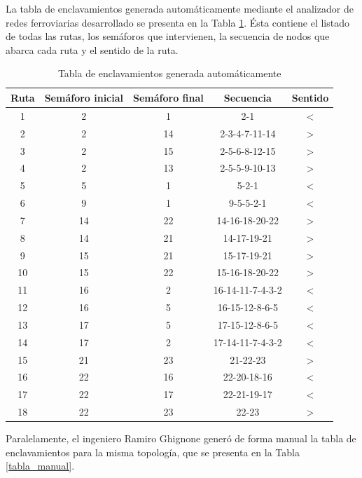 	La tabla de enclavamientos generada automáticamente mediante el analizador de redes ferroviarias desarrollado se presenta en la Tabla \ref{tabla_script}. Ésta contiene el listado de todas las rutas, los semáforos que intervienen, la secuencia de nodos que abarca cada ruta y el sentido de la ruta.
	
	\begin{table}[!hbt]
	\caption{Tabla de enclavamientos generada automáticamente}
	\label{tabla_script}
	\centering
	\begin{tabular}{ c  c  c  c  c }
	\hline
	Ruta & Semáforo inicial & Semáforo final & Secuencia & Sentido \\	
	\hline
		1 & 2 & 1 & 2-1 & < \\
		2 & 2 & 14 & 2-3-4-7-11-14 & > \\
		3 & 2 & 15 & 2-5-6-8-12-15 & > \\
		4 & 2 & 13 & 2-5-5-9-10-13 & > \\
		5 & 5 & 1 & 5-2-1 & < \\
		6 & 9 & 1 & 9-5-5-2-1 & < \\
		7 & 14 & 22 & 14-16-18-20-22 & > \\
		8 & 14 & 21 & 14-17-19-21 & > \\
		9 & 15 & 21 & 15-17-19-21 & > \\
		10 & 15 & 22 & 15-16-18-20-22 & > \\
		11 & 16 & 2 & 16-14-11-7-4-3-2 & < \\
		12 & 16 & 5 & 16-15-12-8-6-5 & < \\
		13 & 17 & 5 & 17-15-12-8-6-5 & < \\
		14 & 17 & 2 & 17-14-11-7-4-3-2 & < \\
		15 & 21 & 23 & 21-22-23 & > \\
		16 & 22 & 16 & 22-20-18-16 & < \\
		17 & 22 & 17 & 22-21-19-17 & < \\
		18 & 22 & 23 & 22-23 & > \\
	\end{tabular}
	\end{table}		
	
	Paralelamente, el ingeniero Ramiro Ghignone generó de forma manual la tabla de enclavamientos para la misma topología, que se presenta en la Tabla \ref{tabla_manual}.
	 
